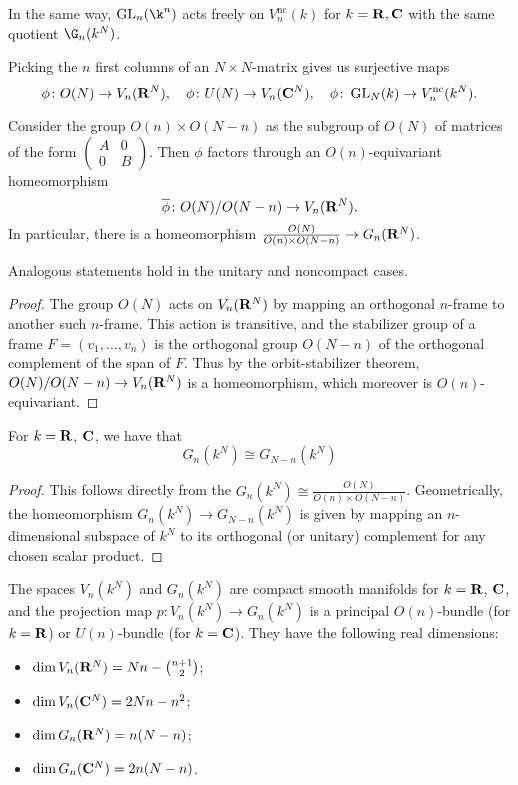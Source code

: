 \documentclass[a4paper,openany]{scrbook}
\begin{document}
\begin{remark}
In the same way, $\GL_n(\k^n)$ acts freely on $V_n^{\operatorname{nc}}(k)$ for $k=\mathbf R,\mathbf C$ with the same quotient $\G_n(k^N)$.
\end{remark}

Picking the $n$ first columns of an $N\times N$-matrix gives us surjective maps
\[
\phi\colon O(N) \to V_n(\mathbf R^N), \quad \phi\colon U(N) \to V_n(\mathbf C^N), \quad \phi\colon \operatorname{GL}_N(k) \to V_n^{\operatorname{nc}}(k^N).
\]

\begin{lemma}\label{lemma:grassstiefelashomogeneousspaces}
Consider the group $O(n) \times O(N-n)$ as the subgroup of $O(N)$ of matrices of the form $\left(\begin{smallmatrix} A & 0\\ 0 & B\end{smallmatrix}\right)$. Then $\phi$ factors through an $O(n)$-equivariant homeomorphism
\[
\overline\phi\colon O(N)/O(N-n) \to V_n(\mathbf R^N).
\]
In particular, there is a homeomorphism $\frac{O(N)}{O(n)\times O(N-n)} \to G_n(\mathbf R^N)$.

Analogous statements hold in the unitary and noncompact cases.
\end{lemma}
\begin{proof}
The group $O(N)$ acts on $V_n(\mathbf R^N)$ by mapping an orthogonal $n$-frame to another such $n$-frame. This action is transitive, and the stabilizer group of a frame $F=(v_1,\dots,v_n)$ is the orthogonal group $O(N-n)$ of the orthogonal complement of the span of $F$. Thus by the orbit-stabilizer theorem, $O(N)/O(N-n) \to V_n(\mathbf R^N)$ is a homeomorphism, which moreover is $O(n)$-equivariant.
\end{proof}


\begin{corollary}
For $k=\mathbf R$, $\mathbf C$, we have that
\[
G_n(k^N) \cong G_{N-n}(k^N)
\]
\end{corollary}
\begin{proof}
This follows directly from the $G_n(k^N) \cong \frac{O(N)}{O(n) \times O(N-n)}$. Geometrically, the homeomorphism $G_n(k^N) \to G_{N-n}(k^N)$ is given by mapping an $n$-dimensional subspace of $k^N$ to its orthogonal (or unitary) complement for any chosen scalar product.
\end{proof}



\begin{corollary} \label{cor:stiefelgrassmannbundle}\label{thm:grassmannianmanifolds}
The spaces $V_n(k^N)$ and $G_n(k^N)$ are compact smooth manifolds for $k=\mathbf R$, $\mathbf C$, and the projection map $p\colon V_n(k^N) \to G_n(k^N)$ is a principal $O(n)$-bundle (for $k=\mathbf R$) or $U(n)$-bundle (for $k=\mathbf C$). They have the following real dimensions:
\begin{itemize}
\item $\dim V_n(\mathbf R^N) = Nn - {n+1 \choose 2}$;
\item $\dim V_n(\mathbf C^N) = 2Nn - n^2$;
\item $\dim G_n(\mathbf R^N) = n(N-n)$;
\item $\dim G_n(\mathbf C^N) = 2n(N-n)$.
\end{itemize}
\end{corollary}
\end{document}
